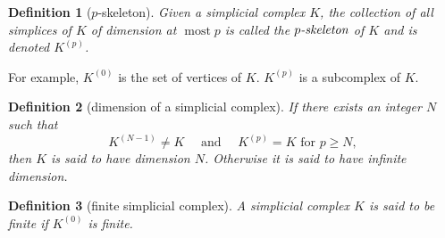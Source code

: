 \documentclass{report}
\newtheorem{definition}{Definition}[section]
\theoremstyle{nonumberplain}
\begin{document}
\begin{definition}[$p$-skeleton]
Given a simplicial complex $K$, the collection of all simplices of $K$ of dimension at $\operatorname{most} p$ is called the $\emph{$p$-skeleton}$ of $K$ and is denoted $K^{(p)}$.
\end{definition}
For example, $K^{(0)}$ is the set of vertices of $K$. $K^{(p)}$ is a subcomplex of $K$.

\begin{definition}[dimension of a simplicial complex]
If there exists an integer $N$ such that
$$
K^{(N-1)} \neq K \quad \text { and } \quad K^{(p)}=K \text { for }p\ge N ,
$$
then $K$ is said to have \emph{dimension} $N$. Otherwise it is said to have infinite dimension.
\end{definition}
\begin{definition}[finite simplicial complex]
A simplicial complex $K$ is said to be \emph{finite} if $K^{(0)}$ is finite.
\end{definition}
\end{document}
